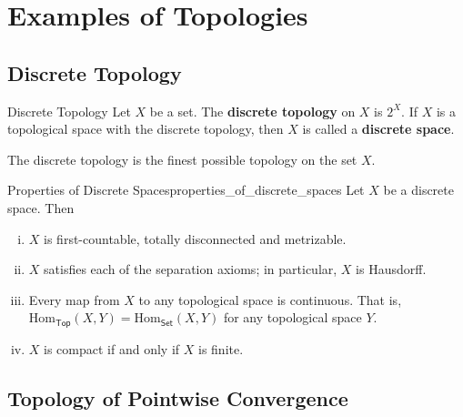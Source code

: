 \documentclass{report}
\begin{document}
\section{Examples of Topologies}
\subsection{Discrete Topology}

\begin{definition}{Discrete Topology}{}
	Let $X$ be a set. The \textbf{discrete topology} on $X$ is $2^X$. If $X$ is a topological space with the discrete topology, then $X$ is called a \textbf{discrete space}.
\end{definition}

The discrete topology is the finest possible topology on the set $X$.

\begin{proposition}{Properties of Discrete Spaces}{properties_of_discrete_spaces}
	Let $X$ be a discrete space. Then
	\begin{enumerate}[(i)]	
		\item $X$ is first-countable, totally disconnected and metrizable.
		\item $X$ satisfies each of the separation axioms; in particular, $X$ is Hausdorff.
		\item Every map from $X$ to any topological space is continuous. That is, $\mathrm{Hom}_{\mathsf{Top}}(X,Y)=\mathrm{Hom}_{\mathsf{Set}}(X,Y)$ for any topological space $Y$.
		\item $X$ is compact if and only if $X$ is finite.
	\end{enumerate}
\end{proposition}

\subsection{Topology of Pointwise Convergence}
\end{document}
